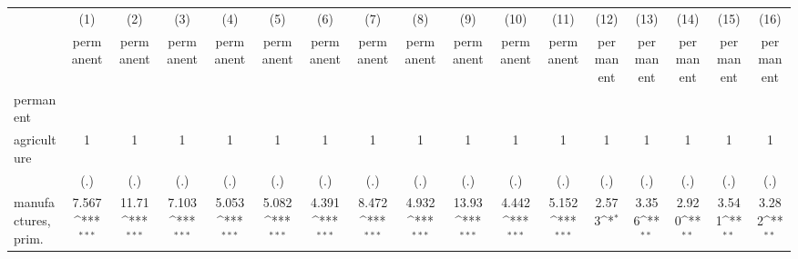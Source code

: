 {
\def\sym#1{\ifmmode^{#1}\else\(^{#1}\)\fi}
\begin{tabular}{l*{16}{c}}
\hline\hline
                    &\multicolumn{1}{c}{(1)}&\multicolumn{1}{c}{(2)}&\multicolumn{1}{c}{(3)}&\multicolumn{1}{c}{(4)}&\multicolumn{1}{c}{(5)}&\multicolumn{1}{c}{(6)}&\multicolumn{1}{c}{(7)}&\multicolumn{1}{c}{(8)}&\multicolumn{1}{c}{(9)}&\multicolumn{1}{c}{(10)}&\multicolumn{1}{c}{(11)}&\multicolumn{1}{c}{(12)}&\multicolumn{1}{c}{(13)}&\multicolumn{1}{c}{(14)}&\multicolumn{1}{c}{(15)}&\multicolumn{1}{c}{(16)}\\
                    &\multicolumn{1}{c}{permanent}&\multicolumn{1}{c}{permanent}&\multicolumn{1}{c}{permanent}&\multicolumn{1}{c}{permanent}&\multicolumn{1}{c}{permanent}&\multicolumn{1}{c}{permanent}&\multicolumn{1}{c}{permanent}&\multicolumn{1}{c}{permanent}&\multicolumn{1}{c}{permanent}&\multicolumn{1}{c}{permanent}&\multicolumn{1}{c}{permanent}&\multicolumn{1}{c}{permanent}&\multicolumn{1}{c}{permanent}&\multicolumn{1}{c}{permanent}&\multicolumn{1}{c}{permanent}&\multicolumn{1}{c}{permanent}\\
\hline
permanent           &                     &                     &                     &                     &                     &                     &                     &                     &                     &                     &                     &                     &                     &                     &                     &                     \\
agriculture         &           1         &           1         &           1         &           1         &           1         &           1         &           1         &           1         &           1         &           1         &           1         &           1         &           1         &           1         &           1         &           1         \\
                    &         (.)         &         (.)         &         (.)         &         (.)         &         (.)         &         (.)         &         (.)         &         (.)         &         (.)         &         (.)         &         (.)         &         (.)         &         (.)         &         (.)         &         (.)         &         (.)         \\
[1em]
manufactures, prim. &       7.567\sym{***}&       11.71\sym{***}&       7.103\sym{***}&       5.053\sym{***}&       5.082\sym{***}&       4.391\sym{***}&       8.472\sym{***}&       4.932\sym{***}&       13.93\sym{***}&       4.442\sym{***}&       5.152\sym{***}&       2.573\sym{*}  &       3.356\sym{**} &       2.920\sym{**} &       3.541\sym{**} &       3.282\sym{**} \\

\end{tabular}}
